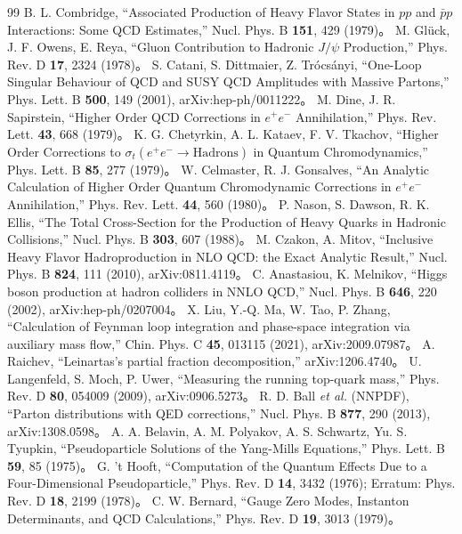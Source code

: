 \documentclass[a4paper,10pt]{ltjsarticle}
\begin{document}
\begin{thebibliography}{99}
 B. L. Combridge, ``Associated Production of Heavy Flavor States in $pp$ and $\bar pp$ Interactions: Some QCD Estimates,'' Nucl. Phys. B \textbf{151}, 429 (1979)。
 M. Glück, J. F. Owens, E. Reya, ``Gluon Contribution to Hadronic $J/\psi$ Production,'' Phys. Rev. D \textbf{17}, 2324 (1978)。
 S. Catani, S. Dittmaier, Z. Trócsányi, ``One-Loop Singular Behaviour of QCD and SUSY QCD Amplitudes with Massive Partons,'' Phys. Lett. B \textbf{500}, 149 (2001), arXiv:hep-ph/0011222。
 M. Dine, J. R. Sapirstein, ``Higher Order QCD Corrections in $e^+e^-$ Annihilation,'' Phys. Rev. Lett. \textbf{43}, 668 (1979)。
 K. G. Chetyrkin, A. L. Kataev, F. V. Tkachov, ``Higher Order Corrections to $\sigma_t(e^+e^-\to\text{Hadrons})$ in Quantum Chromodynamics,'' Phys. Lett. B \textbf{85}, 277 (1979)。
 W. Celmaster, R. J. Gonsalves, ``An Analytic Calculation of Higher Order Quantum Chromodynamic Corrections in $e^+e^-$ Annihilation,'' Phys. Rev. Lett. \textbf{44}, 560 (1980)。
 P. Nason, S. Dawson, R. K. Ellis, ``The Total Cross-Section for the Production of Heavy Quarks in Hadronic Collisions,'' Nucl. Phys. B \textbf{303}, 607 (1988)。
 M. Czakon, A. Mitov, ``Inclusive Heavy Flavor Hadroproduction in NLO QCD: the Exact Analytic Result,'' Nucl. Phys. B \textbf{824}, 111 (2010), arXiv:0811.4119。
 C. Anastasiou, K. Melnikov, ``Higgs boson production at hadron colliders in NNLO QCD,'' Nucl. Phys. B \textbf{646}, 220 (2002), arXiv:hep-ph/0207004。
 X. Liu, Y.-Q. Ma, W. Tao, P. Zhang, ``Calculation of Feynman loop integration and phase-space integration via auxiliary mass flow,'' Chin. Phys. C \textbf{45}, 013115 (2021), arXiv:2009.07987。
 A. Raichev, ``Leinartas's partial fraction decomposition,'' arXiv:1206.4740。
 U. Langenfeld, S. Moch, P. Uwer, ``Measuring the running top-quark mass,'' Phys. Rev. D \textbf{80}, 054009 (2009), arXiv:0906.5273。
 R. D. Ball \textit{et al.} (NNPDF), ``Parton distributions with QED corrections,'' Nucl. Phys. B \textbf{877}, 290 (2013), arXiv:1308.0598。
 A. A. Belavin, A. M. Polyakov, A. S. Schwartz, Yu. S. Tyupkin, ``Pseudoparticle Solutions of the Yang-Mills Equations,'' Phys. Lett. B \textbf{59}, 85 (1975)。
 G. 't Hooft, ``Computation of the Quantum Effects Due to a Four-Dimensional Pseudoparticle,'' Phys. Rev. D \textbf{14}, 3432 (1976); Erratum: Phys. Rev. D \textbf{18}, 2199 (1978)。
 C. W. Bernard, ``Gauge Zero Modes, Instanton Determinants, and QCD Calculations,'' Phys. Rev. D \textbf{19}, 3013 (1979)。

\end{thebibliography}
\end{document}
